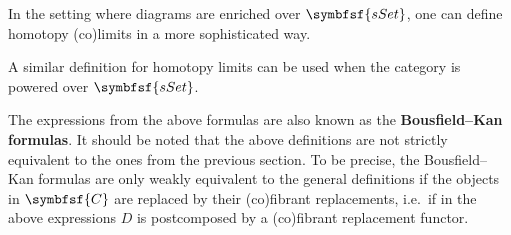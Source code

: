     In the setting where diagrams are enriched over $\symbfsf{sSet}$, one can define homotopy (co)limits in a more sophisticated way.

    A similar definition for homotopy limits can be used when the category is powered over $\symbfsf{sSet}$.
    \begin{remark}
        The expressions from the above formulas are also known as the \textbf{Bousfield--Kan formulas}. It should be noted that the above definitions are not strictly equivalent to the ones from the previous section. To be precise, the Bousfield--Kan formulas are only weakly equivalent to the general definitions if the objects in $\symbfsf{C}$ are replaced by their (co)fibrant replacements, i.e.~if in the above expressions $D$ is postcomposed by a (co)fibrant replacement functor.
    \end{remark}


